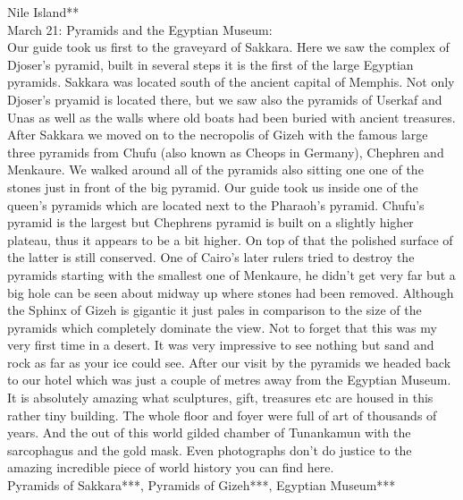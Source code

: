 Nile Island**\\

March 21: Pyramids and the Egyptian Museum:\\
Our guide took us first to the graveyard of Sakkara. Here we saw the complex of Djoser's pyramid, built in several steps it is the first of the large Egyptian pyramids. Sakkara was located south of the ancient capital of Memphis. Not only Djoser's pryamid is located there, but we saw also the pyramids of Userkaf and Unas as well as the walls where old boats had been buried with ancient treasures. After Sakkara we moved on to the necropolis of Gizeh with the famous large three pyramids from Chufu (also known as Cheops in Germany), Chephren and Menkaure. We walked around all of the pyramids also sitting one one of the stones just in front of the big pyramid. Our guide took us inside one of the queen's pyramids which are located next to the Pharaoh's pyramid. Chufu's pyramid is the largest but Chephrens pyramid is built on a slightly higher plateau, thus it appears to be a bit higher. On top of that the polished surface of the latter is still conserved. One of Cairo's later rulers tried to destroy the pyramids starting with the smallest one of Menkaure, he didn't get very far but a big hole can be seen about midway up where stones had been removed. Although the Sphinx of Gizeh is gigantic it just pales in comparison to the size of the pyramids which completely dominate the view. Not to forget that this was my very first time in a desert. It was very impressive to see nothing but sand and rock as far as your ice could see. After our visit by the pyramids we headed back to our hotel which was just a couple of metres away from the Egyptian Museum. It is absolutely amazing what sculptures, gift, treasures etc are housed in this rather tiny building. The whole floor and foyer were full of art of thousands of years. And the out of this world gilded chamber of Tunankamun with the sarcophagus and the gold mask. Even photographs don't do justice to the amazing incredible piece of world history you can find here.\\

Pyramids of Sakkara***, Pyramids of Gizeh***, Egyptian Museum***\\

